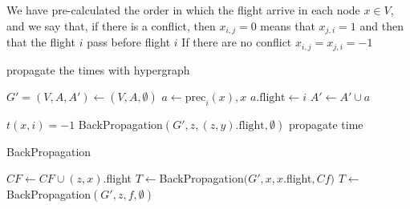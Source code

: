 \documentclass[class=article, crop=false]{standalone}
\begin{document}

We have pre-calculated the order in which the flight arrive in each node $x\in V$, and we say that, if there is a conflict, then $x_{i,j}=0$ means that $x_{j,i}=1$ and then that the flight $i$ pass before flight $i$
If there are no conflict $x_{i,j}=x_{j,i}=-1$
\begin{algorithm}
\caption{propagate the times with hypergraph}\label{alg:hyperalgo}

\begin{algorithmic}

\STATE $G'=(V,A,A')\gets (V,A,\emptyset)$ %
                    \STATE $a \gets \text{prec}_i(x),x$
                    \STATE $a.\text{flight}\gets i$
                    \STATE $A'\gets A'\cup a$
                \ENDIF
            \ENDFOR
        \ENDIF
    \ENDFOR
\ENDFOR

        \STATE $t(x,i)=-1$
    \ENDFOR
\ENDFOR
{}
            \STATE BackPropagation$(G',z, (z,y).\text{flight},\emptyset)$
        \ELSE
            \STATE propagate time
        \ENDIF
    \ENDFOR
\ENDFOR


\end{algorithmic}
\end{algorithm}
\newpage

\begin{algorithm}
\caption{BackPropagation}\label{alg:backPropagation}
\begin{algorithmic}
\ENDIF
{}
    \STATE $CF\gets CF\cup (z,x).$flight
    \STATE $T\gets$BackPropagation$(G',x,x.$flight$,Cf)$
\ELSE
    \STATE $T\gets$BackPropagation$(G',z,f,\emptyset)$
\ENDIF

\end{algorithmic}
\end{algorithm}
\end{document}
